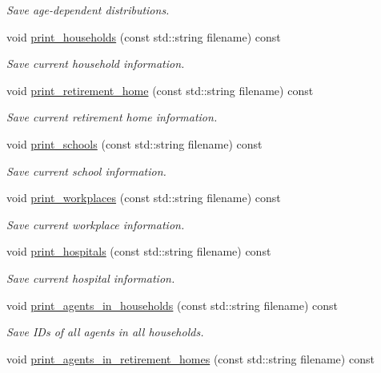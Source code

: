 \begin{DoxyCompactItemize}
\begin{DoxyCompactList}\small\item\em Save age-\/dependent distributions. \end{DoxyCompactList}\item 
void \hyperlink{classABM_a5d0d2b32a368c082d8217f2d3a22b832}{print\+\_\+households} (const std\+::string filename) const
\begin{DoxyCompactList}\small\item\em Save current household information. \end{DoxyCompactList}\item 
void \hyperlink{classABM_afaddfd46a69c396b8e9648041e014c86}{print\+\_\+retirement\+\_\+home} (const std\+::string filename) const
\begin{DoxyCompactList}\small\item\em Save current retirement home information. \end{DoxyCompactList}\item 
void \hyperlink{classABM_a9363f01996ce065a1e3009f3c1d43126}{print\+\_\+schools} (const std\+::string filename) const
\begin{DoxyCompactList}\small\item\em Save current school information. \end{DoxyCompactList}\item 
void \hyperlink{classABM_a72f37504297bcc5392f68e002c4bc380}{print\+\_\+workplaces} (const std\+::string filename) const
\begin{DoxyCompactList}\small\item\em Save current workplace information. \end{DoxyCompactList}\item 
void \hyperlink{classABM_a7ac686e0d4771009ab25cfbdc33749ea}{print\+\_\+hospitals} (const std\+::string filename) const
\begin{DoxyCompactList}\small\item\em Save current hospital information. \end{DoxyCompactList}\item 
void \hyperlink{classABM_a8f94332461f1b9494481c1213eb9f3d2}{print\+\_\+agents\+\_\+in\+\_\+households} (const std\+::string filename) const
\begin{DoxyCompactList}\small\item\em Save I\+Ds of all agents in all households. \end{DoxyCompactList}\item 
void \hyperlink{classABM_ab1b1192eff4a2e10f4a05d87c6e3d896}{print\+\_\+agents\+\_\+in\+\_\+retirement\+\_\+homes} (const std\+::string filename) const

\end{DoxyCompactItemize}
